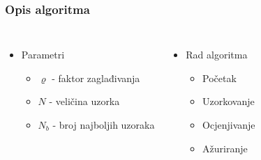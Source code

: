 \documentclass{beamer}
\newcommand{\floor}[1]{\lfloor #1 \rfloor}
\begin{document}
\begin{frame}
\frametitle{Opis algoritma}
  \begin{columns}[t]
    \begin{itemize}
    \item Parametri
      \begin{itemize}
        \item $\varrho$ - faktor zaglađivanja
        \item $N$ - veličina uzorka
        \item $N_b$ - broj najboljih uzoraka
      \end{itemize}
    \end{itemize}
      \begin{itemize}
      \item Rad algoritma
      \begin{itemize}
        \item Početak
        \item Uzorkovanje
        \item Ocjenjivanje
        \item Ažuriranje
      \end{itemize}
      \end{itemize}
  \end{columns}
\end{frame}



\end{document}
